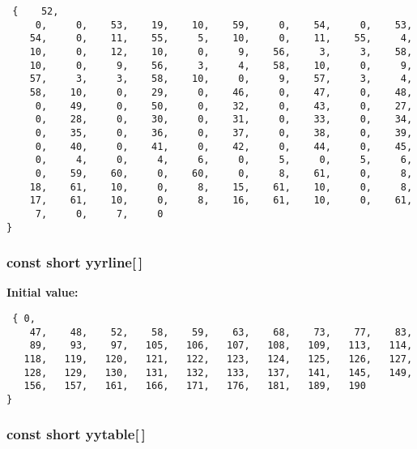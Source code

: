 \footnotesize\begin{verbatim} {    52,
     0,     0,    53,    19,    10,    59,     0,    54,     0,    53,
    54,     0,    11,    55,     5,    10,     0,    11,    55,     4,
    10,     0,    12,    10,     0,     9,    56,     3,     3,    58,
    10,     0,     9,    56,     3,     4,    58,    10,     0,     9,
    57,     3,     3,    58,    10,     0,     9,    57,     3,     4,
    58,    10,     0,    29,     0,    46,     0,    47,     0,    48,
     0,    49,     0,    50,     0,    32,     0,    43,     0,    27,
     0,    28,     0,    30,     0,    31,     0,    33,     0,    34,
     0,    35,     0,    36,     0,    37,     0,    38,     0,    39,
     0,    40,     0,    41,     0,    42,     0,    44,     0,    45,
     0,     4,     0,     4,     6,     0,     5,     0,     5,     6,
     0,    59,    60,     0,    60,     0,     8,    61,     0,     8,
    18,    61,    10,     0,     8,    15,    61,    10,     0,     8,
    17,    61,    10,     0,     8,    16,    61,    10,     0,    61,
     7,     0,     7,     0
}\end{verbatim}\normalsize 
{}
\subsubsection{\setlength{\rightskip}{0pt plus 5cm}const short yyrline[$\,$]\hspace{0.3cm}{\tt  [static]}}\label{vcd__parser_8c_a86}


{\bf Initial value:}

\footnotesize\begin{verbatim} { 0,
    47,    48,    52,    58,    59,    63,    68,    73,    77,    83,
    89,    93,    97,   105,   106,   107,   108,   109,   113,   114,
   118,   119,   120,   121,   122,   123,   124,   125,   126,   127,
   128,   129,   130,   131,   132,   133,   137,   141,   145,   149,
   156,   157,   161,   166,   171,   176,   181,   189,   190
}\end{verbatim}\normalsize 
{}
\subsubsection{\setlength{\rightskip}{0pt plus 5cm}const short yytable[$\,$]\hspace{0.3cm}{\tt  [static]}}\label{vcd__parser_8c_a94}


